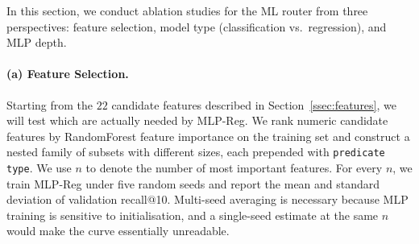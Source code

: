 

In this section, we conduct ablation studies for the ML router from three perspectives: feature selection, model type (classification vs.\ regression), and MLP depth.




\paragraph{(a) Feature Selection.}
\label{sssec:feature-selection}

Starting from the $22$ candidate features described in Section~\ref{ssec:features}, we will test which are actually needed by MLP-Reg.
We rank numeric candidate features by RandomForest feature importance on the training set and construct a nested family of subsets with different sizes, each prepended with \texttt{predicate type}.
We use $n$ to denote the number of most important features.
For every $n$, we train MLP-Reg under five random seeds %
and report the mean and standard deviation of validation recall@10.
Multi-seed averaging is necessary because MLP training is sensitive to initialisation, and a single-seed estimate at the same $n$ would make the curve essentially unreadable.

